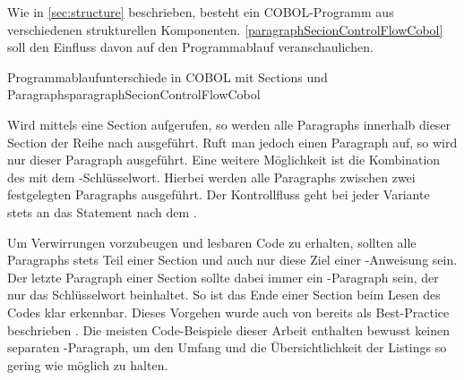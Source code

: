 Wie in \autoref{sec:structure} beschrieben, besteht ein COBOL-Programm aus verschiedenen strukturellen Komponenten. \autoref{paragraphSecionControlFlowCobol} soll den Einfluss davon auf den Pro\-grammab\-lauf veranschaulichen.

\clearpage

\begin{codeWithCaption}{Programmablaufunterschiede in COBOL mit Sections und Paragraphs}{paragraphSecionControlFlowCobol}
 \cFollow
{}
\end{codeWithCaption}

Wird mittels  eine Section aufgerufen, so werden alle Paragraphs innerhalb dieser Section der Reihe nach ausgeführt. Ruft man jedoch einen Paragraph auf, so wird nur dieser Paragraph ausgeführt. Eine weitere Möglichkeit ist die Kombination des  mit dem -Schlüsselwort. Hierbei werden alle Paragraphs zwischen zwei festgelegten Paragraphs ausgeführt. Der Kontrollfluss geht bei jeder Variante stets an das Statement nach dem .

Um Verwirrungen vorzubeugen und lesbaren Code zu erhalten, sollten alle Paragraphs stets Teil einer Section und auch nur diese Ziel einer -Anweisung sein. Der letzte Paragraph einer Section sollte dabei immer ein -Paragraph sein, der nur das Schlüsselwort  beinhaltet. So ist das Ende einer Section beim Lesen des Codes klar erkennbar. Dieses Vorgehen wurde auch von \citeauthor{richards_enhancing_1984} bereits \citeyear{richards_enhancing_1984} als Best-Practice beschrieben  \cite{richards_enhancing_1984}. Die meisten Code-Beispiele dieser Arbeit enthalten bewusst keinen separaten -Paragraph, um den Umfang und die Übersichtlichkeit der Listings so gering wie möglich zu halten. 